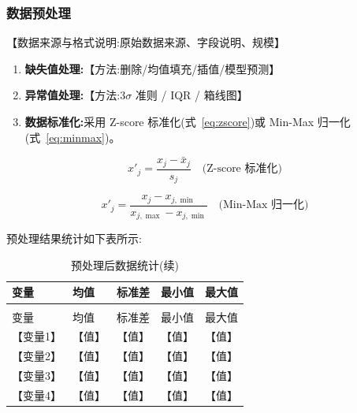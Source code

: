 
\subsubsection{数据预处理}


【数据来源与格式说明:原始数据来源、字段说明、规模】

\begin{enumerate}[itemindent=2em]
  \item \textbf{缺失值处理:}【方法:删除/均值填充/插值/模型预测】
  \item \textbf{异常值处理:}【方法:3$\sigma$ 准则 / IQR / 箱线图】
  \item \textbf{数据标准化:}采用 Z-score 标准化(式~\ref{eq:zscore})或 Min-Max 归一化(式~\ref{eq:minmax})。
\end{enumerate}

\begin{equation}
x'_j = \frac{x_j - \bar{x}_j}{s_j} \quad \text{(Z-score 标准化)} \label{eq:zscore}
\end{equation}

\begin{equation}
x'_j = \frac{x_j - x_{j,\min}}{x_{j,\max} - x_{j,\min}} \quad \text{(Min-Max 归一化)} \label{eq:minmax}
\end{equation}

预处理结果统计如下表所示:

\begin{longtable}{>{\centering\arraybackslash}p{}>{\centering\arraybackslash}p{}>{\centering\arraybackslash}p{}>{\centering\arraybackslash}p{}>{\centering\arraybackslash}p{}}
  \caption{预处理后数据统计}\\
  \toprule
  变量 & 均值 & 标准差 & 最小值 & 最大值 \\
  \midrule
  \endfirsthead
  \caption{预处理后数据统计(续)}\\
  \toprule
  变量 & 均值 & 标准差 & 最小值 & 最大值 \\
  \midrule
  \endhead
  \bottomrule
  \endfoot
  【变量1】& 【值】& 【值】& 【值】& 【值】\\
  【变量2】& 【值】& 【值】& 【值】& 【值】\\
  【变量3】& 【值】& 【值】& 【值】& 【值】\\
  【变量4】& 【值】& 【值】& 【值】& 【值】\\
\end{longtable}

